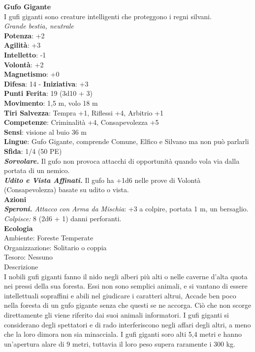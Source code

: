 \begin{multicols}{2}
\medskip\textbf{Gufo Gigante}\\
I gufi giganti sono creature intelligenti che proteggono i regni silvani.\\
\emph{Grande bestia, neutrale}\\
\textbf{Potenza}: +2\\
\textbf{Agilità}: +3\\
\textbf{Intelletto}: -1\\
\textbf{Volontà}: +2\\
\textbf{Magnetismo}: +0\\
\textbf{Difesa}: 14 - \textbf{Iniziativa}: +3\\
\textbf{Punti Ferita}: 19 (3d10 + 3)\\
\textbf{Movimento}: 1,5 m, volo 18 m\\
\textbf{Tiri Salvezza}: Tempra +1, Riflessi +4, Arbitrio +1 \\
\textbf{Competenze}: Criminalità +4, Consapevolezza +5\\
\textbf{Sensi}: visione al buio 36 m\\
\textbf{Lingue}: Gufo Gigante, comprende Comune, Elfico e Silvano ma non può parlarli\\
\textbf{Sfida}: 1/4 (50 PE)\smallskip\\
\emph{\textbf{Sorvolare.}} Il gufo non provoca attacchi di opportunità quando vola via dalla portata di un nemico.\\
\emph{\textbf{Udito e Vista Affinati.}} Il gufo ha +1d6 nelle prove di Volontà (Consapevolezza) basate su udito o vista.\\
\smallskip\textbf{Azioni}\\
\emph{\textbf{Speroni.} Attacco con Arma da Mischia}: +3 a colpire, portata 1 m, un bersaglio.\\
\emph{Colpisce:} 8 (2d6 + 1) danni perforanti.\\
\textbf{Ecologia}\\
Ambiente: Foreste Temperate\\
Organizzazione: Solitario o coppia\\
Tesoro: Nessuno\\
Descrizione\\

I nobili gufi giganti fanno il nido negli alberi più alti o nelle caverne d'alta quota nei pressi della sua foresta. Essi non sono semplici animali, e si vantano di essere intellettuali sopraffini e abili nel giudicare i caratteri altrui, Accade ben poco nella foresta di un gufo gigante senza che questi se ne accorga. Ciò che non scorge direttamente gli viene riferito dai suoi animali informatori. I gufi giganti si considerano degli spettatori e di rado interferiscono negli affari degli altri, a meno che la loro dimora non sia minacciala. I gufi giganti soro alti 5,4 metri e hanno un'apertura alare di 9 metri, tuttavia il loro peso supera raramente i 300 kg. \\



\end{multicols}
